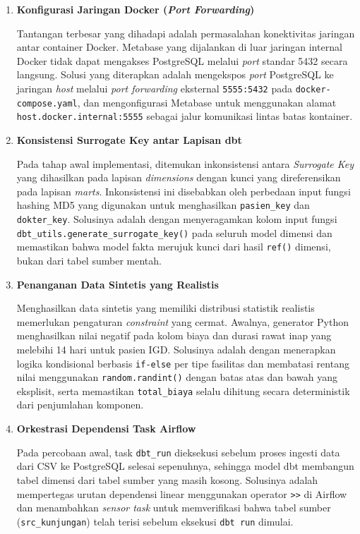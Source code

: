 \begin{enumerate}
 
  \item \textbf{Konfigurasi Jaringan Docker (\textit{Port Forwarding})}
 
  Tantangan terbesar yang dihadapi adalah permasalahan konektivitas jaringan antar container Docker. Metabase yang dijalankan di luar jaringan internal Docker tidak dapat mengakses PostgreSQL melalui \textit{port} standar 5432 secara langsung. Solusi yang diterapkan adalah mengekspos \textit{port} PostgreSQL ke jaringan \textit{host} melalui \textit{port forwarding} eksternal \texttt{5555:5432} pada \texttt{docker-compose.yaml}, dan mengonfigurasi Metabase untuk menggunakan alamat \texttt{host.docker.internal:5555} sebagai jalur komunikasi lintas batas kontainer.
 
  \item \textbf{Konsistensi Surrogate Key antar Lapisan dbt}
 
  Pada tahap awal implementasi, ditemukan inkonsistensi antara \textit{Surrogate Key} yang dihasilkan pada lapisan \textit{dimensions} dengan kunci yang direferensikan pada lapisan \textit{marts}. Inkonsistensi ini disebabkan oleh perbedaan input fungsi hashing MD5 yang digunakan untuk menghasilkan \texttt{pasien\_key} dan \texttt{dokter\_key}. Solusinya adalah dengan menyeragamkan kolom input fungsi \texttt{dbt\_utils.generate\_surrogate\_key()} pada seluruh model dimensi dan memastikan bahwa model fakta merujuk kunci dari hasil \texttt{ref()} dimensi, bukan dari tabel sumber mentah.
 
  \item \textbf{Penanganan Data Sintetis yang Realistis}
 
  Menghasilkan data sintetis yang memiliki distribusi statistik realistis memerlukan pengaturan \textit{constraint} yang cermat. Awalnya, generator Python menghasilkan nilai negatif pada kolom biaya dan durasi rawat inap yang melebihi 14 hari untuk pasien IGD. Solusinya adalah dengan menerapkan logika kondisional berbasis \texttt{if-else} per tipe fasilitas dan membatasi rentang nilai menggunakan \texttt{random.randint()} dengan batas atas dan bawah yang eksplisit, serta memastikan \texttt{total\_biaya} selalu dihitung secara deterministik dari penjumlahan komponen.
 
  \item \textbf{Orkestrasi Dependensi Task Airflow}
 
  Pada percobaan awal, task \texttt{dbt\_run} dieksekusi sebelum proses ingesti data dari CSV ke PostgreSQL selesai sepenuhnya, sehingga model dbt membangun tabel dimensi dari tabel sumber yang masih kosong. Solusinya adalah mempertegas urutan dependensi linear menggunakan operator \texttt{>>} di Airflow dan menambahkan \textit{sensor task} untuk memverifikasi bahwa tabel sumber (\texttt{src\_kunjungan}) telah terisi sebelum eksekusi \texttt{dbt run} dimulai.
 

\end{enumerate}
